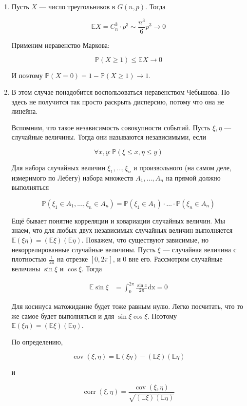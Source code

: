 \documentclass[12pt]{article}
\renewcommand{\P}{\mathbb{P}}
\newcommand{\E}{\mathbb{E}}
\begin{document}
\begin{enumerate}
\item Пусть $X$ — число треугольников в $G(n, p)$. Тогда

\[
\E X = C^3_n \cdot p^3 \sim \frac {n^3} 6 p^3 \to 0
\]

Применим неравенство Маркова:

\[
\P(X \geq 1) \leq \E X \to 0
\]

И поэтому $\P(X = 0) = 1 - \P(X \geq 1) \to 1$.

\item В этом случае понадобится воспользоваться неравенством Чебышова. Но здесь не получится так просто раскрыть дисперсию, потому что она не линейна.

Вспомним, что такое независимость совокупности событий. Пусть $\xi, \eta$ — случайные величины. Тогда они называются независимыми, если

\[
\forall x, y \colon \P (\xi \leq x, \eta \leq y)
\]

Для набора случайных величин $\xi_1, \ldots, \xi_n$ и произвольного (на самом деле, измеримого по Лебегу) набора множеств $A_1, \ldots, A_n$ на прямой должно выполняться

\[
\P (\xi_1 \in A_1, \ldots, \xi_n \in A_n) = \P(\xi_1 \in A_1) \cdot \ldots \cdot \P(\xi_n \in A_n)
\]

Ещё бывает понятие корреляции и ковариации случайных величин. Мы знаем, что для любых двух независимых случайных величин выполняется $\E (\xi \eta) = (\E \xi) (\E \eta)$. Покажем, что существуют зависимые, но некоррелированные случайные величины. Пусть $\xi$ — случайная величина с плотностью $\frac 1 {2 \pi}$ на отрезке $[0, 2 \pi]$, и 0 вне его. Рассмотрим случайные величины $\sin \xi$ и $\cos \xi$. Тогда

\begin{align*}
\E \sin \xi &= \int^{2 \pi}_0 \frac {\sin x} {2 \pi} \mathrm{dx} = 0
\end{align*}

Для косинуса матожидание будет тоже равным нулю. Легко посчитать, что то же самое будет выполняться и для $\sin \xi \cos \xi$. Поэтому $\E (\xi \eta) = (\E \xi) (\E \eta)$.

По определению,

\[
\operatorname{cov}(\xi, \eta) =
\E (\xi \eta) - (\E \xi) (\E \eta)
\]

и

\[
\operatorname{corr}(\xi, \eta) =
\frac {\operatorname{cov} (\xi, \eta)} {\sqrt{(\E \xi) (\E \eta)}}
\]


\end{enumerate}
\end{document}
